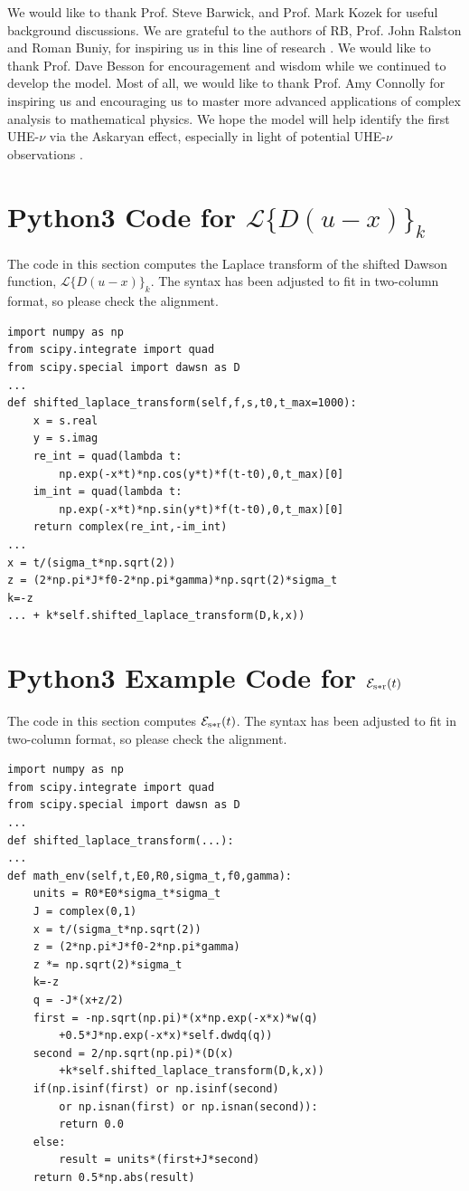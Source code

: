 \documentclass[amsmath,amssymb,aps,prd,10pt,twocolumn,showkeys]{revtex4}
\begin{document}
We would like to thank Prof. Steve Barwick, and Prof. Mark Kozek for useful background discussions.  We are grateful to the authors of RB, Prof. John Ralston and Roman Buniy, for inspiring us in this line of research \cite{10.1103/physrevd.65.016003}.  We would like to thank Prof. Dave Besson for encouragement and wisdom while we continued to develop the model.  Most of all, we would like to thank Prof. Amy Connolly for inspiring us and encouraging us to master more advanced applications of complex analysis to mathematical physics.  We hope the model will help identify the first UHE-$\nu$ via the Askaryan effect, especially in light of potential UHE-$\nu$ observations \cite{collaboration2025observation-22f}.

\appendix

\section{Python3 Code for $\mathcal{L}\lbrace D(u-x)\rbrace_k$}
\label{sec:appA}

The code in this section computes the Laplace transform of the shifted Dawson function, $\mathcal{L}\lbrace D(u-x)\rbrace_k$.  The syntax has been adjusted to fit in two-column format, so please check the alignment.

\small
\begin{verbatim}
import numpy as np
from scipy.integrate import quad
from scipy.special import dawsn as D
...
def shifted_laplace_transform(self,f,s,t0,t_max=1000):
    x = s.real
    y = s.imag
    re_int = quad(lambda t: 
        np.exp(-x*t)*np.cos(y*t)*f(t-t0),0,t_max)[0]
    im_int = quad(lambda t: 
        np.exp(-x*t)*np.sin(y*t)*f(t-t0),0,t_max)[0]
    return complex(re_int,-im_int)
...
x = t/(sigma_t*np.sqrt(2))
z = (2*np.pi*J*f0-2*np.pi*gamma)*np.sqrt(2)*sigma_t
k=-z
... + k*self.shifted_laplace_transform(D,k,x))
\end{verbatim}

\section{Python3 Example Code for $\mathcal{E}_{\rm s * r}(t)$}
\label{sec:appB}

The code in this section computes $\mathcal{E}_{\rm s * r}(t)$.  The syntax has been adjusted to fit in two-column format, so please check the alignment.

\small
\begin{verbatim}
import numpy as np
from scipy.integrate import quad
from scipy.special import dawsn as D
...
def shifted_laplace_transform(...):
...
def math_env(self,t,E0,R0,sigma_t,f0,gamma):
    units = R0*E0*sigma_t*sigma_t
    J = complex(0,1)
    x = t/(sigma_t*np.sqrt(2))
    z = (2*np.pi*J*f0-2*np.pi*gamma)
    z *= np.sqrt(2)*sigma_t
    k=-z
    q = -J*(x+z/2)
    first = -np.sqrt(np.pi)*(x*np.exp(-x*x)*w(q)
        +0.5*J*np.exp(-x*x)*self.dwdq(q))
    second = 2/np.sqrt(np.pi)*(D(x)
        +k*self.shifted_laplace_transform(D,k,x))
    if(np.isinf(first) or np.isinf(second) 
        or np.isnan(first) or np.isnan(second)):
        return 0.0
    else:
        result = units*(first+J*second)
    return 0.5*np.abs(result)
\end{verbatim}
\end{document}
